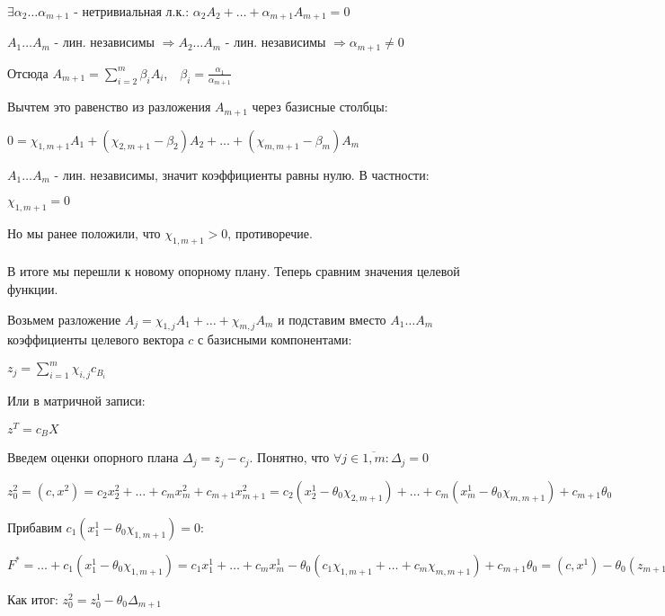 \documentclass[11pt]{article}
\begin{document}
\begin{sloppypar}
$\exists \alpha_2 \dots \alpha_{m+1}$ - нетривиальная л.к.: $\alpha_2 A_2 + \dots + \alpha_{m+1} A_{m+1} = 0$

$A_1 \dots A_m$ - лин. независимы $\Rightarrow A_2 \dots A_m$ - лин. независимы $\Rightarrow \alpha_{m + 1} \neq 0$

Отсюда $A_{m+1} = \sum_{i = 2}^m \beta_i A_i$,\ \ $\beta_i = \frac{\alpha_1}{\alpha_{m+1}}$

Вычтем это равенство из разложения $A_{m+1}$ через базисные столбцы:

$0 = \chi_{1, m+1}A_1 + (\chi_{2, m+1} - \beta_2)A_2 + \dots + (\chi_{m, m+1} - \beta_m)A_m$

$A_1 \dots A_m$ - лин. независимы, значит коэффициенты равны нулю. В частности:

$\chi_{1, m+1} = 0$

Но мы ранее положили, что $\chi_{1, m+1} > 0$, противоречие. \\~\\

В итоге мы перешли к новому опорному плану. Теперь сравним значения целевой функции.

Возьмем разложение $A_j = \chi_{1, j}A_1 + \dots + \chi_{m, j}A_m$ и подставим вместо $A_1 \dots A_m$ коэффициенты целевого вектора $c$ с базисными компонентами:

$z_j = \sum_{i = 1}^m \chi_{i, j} c_{B_i}$

Или в матричной записи:

$z^T = c_B X$

Введем оценки опорного плана $\Delta_j = z_j - c_j$. Понятно, что $\forall j \in \overline{1, m}: \Delta_j = 0$

$z^2_0 = (c, x^2) = c_2 x^2_2 + \dots + c_m x^2_m + c_{m+1}x^2_{m+1} = c_2(x^1_2 - \theta_0 \chi_{2, m+1}) + \dots + c_m(x^1_m - \theta_0 \chi_{m, m+1}) + c_{m+1}\theta_0$

Прибавим $c_1(x^1_1 - \theta_0 \chi_{1, m+1}) = 0$:

$F^* = \dots + c_1(x^1_1 - \theta_0 \chi_{1, m+1}) = c_1 x^1_1 + \dots + c_m x^1_m - \theta_0(c_1 \chi_{1, m+1} + \dots + c_m \chi_{m, m+1}) + c_{m+1} \theta_0 = (c, x^1) - \theta_0 (z_{m+1} - c_{m+1}) = z^1_0  - \theta_0 \Delta_{m+1}$

Как итог: $z^2_0 = z^1_0 - \theta_0 \Delta_{m+1}$ \\~\\


\end{sloppypar}
\end{document}
